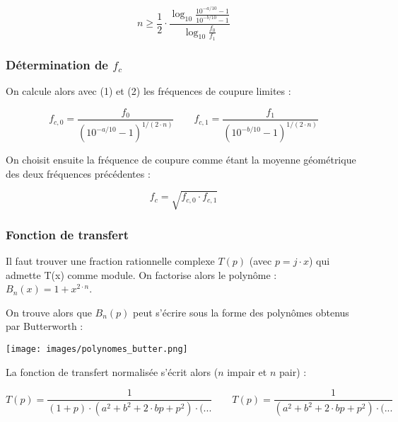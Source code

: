 \documentclass[a4paper,french]{paper}
\begin{document}
$$ n \ge \frac{1}{2} \cdot \frac{\log_{10} \frac{10^{-a/10} - 1}{10^{-b/10} - 1}}{\log_{10} \frac{f_0}{f_1}}$$


\subsubsection*{Détermination de $f_c$}

On calcule alors avec (1) et (2) les fréquences de coupure limites :

$$f_{c,0} = \frac{f_0}{(10^{-a/10} - 1)^{1/(2\cdot n)}} \qquad f_{c,1} = \frac{f_1}{(10^{-b/10} - 1)^{1/(2\cdot n)}}$$

On choisit ensuite la fréquence de coupure comme étant la moyenne géométrique des deux fréquences précédentes :

$$f_c = \sqrt{f_{c,0} \cdot f_{c,1}} $$


\subsubsection*{Fonction de transfert}

Il faut trouver une fraction rationnelle complexe $T(p)$ (avec $p=j\cdot x$) qui admette T(x) comme module. On factorise alors le polynôme : $B_n(x) = 1 + x^{2\cdot n}$. 

On trouve alors que $B_n(p)$ peut s'écrire sous la forme des polynômes obtenus par Butterworth :

\begin{center}
	\texttt{[image: images/polynomes\_butter.png]}
\end{center}


La fonction de transfert normalisée s'écrit alors ($n$ impair et $n$ pair) :

$$ T(p) = \frac{1}{(1 + p) \cdot (a^2 + b^2 + 2\cdot b p + p^2) \cdot (...} \qquad  T(p) = \frac{1}{(a^2 + b^2 + 2\cdot b p + p^2) \cdot (...} $$
\end{document}
